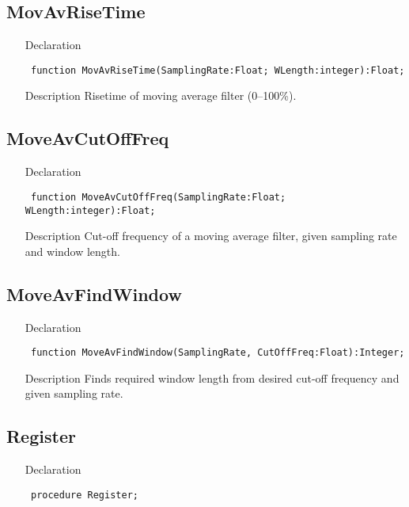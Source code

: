 \documentclass[12pt,a4paper,oneside]{report}
\newcommand{\declarationitem}[1]{{\addfontfeatures{FakeBold=1.3} #1}}
\newcommand{\descriptiontitle}[1]{{\addfontfeatures{FakeSlant}#1}}
\newcommand{\code}[1]{\texttt{#1}}
\begin{document}
\subsection{MovAvRiseTime}
\label{lmfilters-MovAvRiseTime}
\begin{itemize}\item[\declarationitem{Declaration}\hfill]
	\begin{flushleft}
		\code{
			function MovAvRiseTime(SamplingRate:Float; WLength:integer):Float;}
	\end{flushleft}
	\item[\descriptiontitle{Description}]
	Risetime of moving average filter (0--100{\%}).
\end{itemize}
\subsection{MoveAvCutOffFreq}
\label{lmfilters-MoveAvCutOffFreq}
\begin{itemize}\item[\declarationitem{Declaration}\hfill]
	\begin{flushleft}
		\code{
			function MoveAvCutOffFreq(SamplingRate:Float; WLength:integer):Float;}
	\end{flushleft}
	\item[\descriptiontitle{Description}]
	Cut{-}off frequency of a moving average filter, given sampling rate and window length.
\end{itemize}
\subsection{MoveAvFindWindow}
\label{lmfilters-MoveAvFindWindow}
\begin{itemize}\item[\declarationitem{Declaration}\hfill]
	\begin{flushleft}
		\code{
			function MoveAvFindWindow(SamplingRate, CutOffFreq:Float):Integer;}
	\end{flushleft}
	\item[\descriptiontitle{Description}]
	Finds required window length from desired cut{-}off frequency and given sampling rate.
\end{itemize}
\subsection{Register}
\label{lmfilters-Register}
\begin{itemize}\item[\declarationitem{Declaration}\hfill]
	\begin{flushleft}
		\code{
			procedure Register;}
	\end{flushleft}
\end{itemize}
\end{document}
